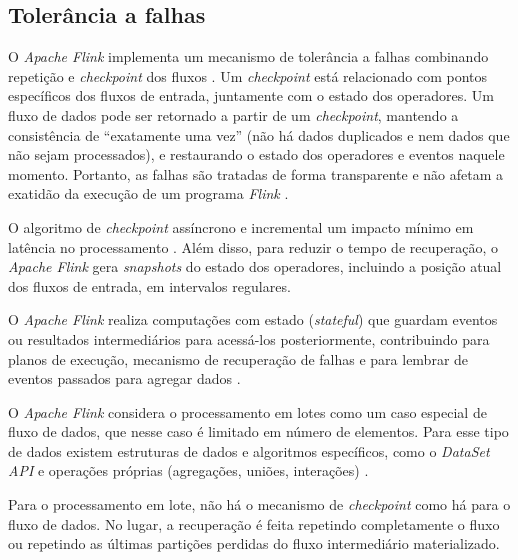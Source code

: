
\subsection{Tolerância a falhas}

O \emph{Apache Flink} implementa um mecanismo de tolerância a falhas combinando repetição e
\emph{checkpoint} dos fluxos \cite{Carbone2015,ApacheFlink2020}.
Um \emph{checkpoint} está relacionado com pontos específicos dos fluxos de
entrada, juntamente com o estado dos operadores.
Um fluxo de dados pode ser retornado a partir de um \emph{checkpoint}, mantendo
a consistência de ``exatamente uma vez'' (não há dados duplicados e nem dados que
não sejam processados), e restaurando o estado dos operadores e eventos naquele
momento.
Portanto, as falhas são tratadas de forma transparente e não afetam a exatidão
da execução de um programa \emph{Flink} \cite{ApacheFlink2020}.

O algoritmo de \emph{checkpoint} assíncrono e incremental  um impacto
mínimo em latência no processamento \cite{Carbone2015}.
Além disso, para reduzir o tempo de recuperação, o \emph{Apache Flink} gera
\emph{snapshots} do estado dos operadores, incluindo a posição atual dos fluxos
de entrada, em intervalos regulares.


O \emph{Apache Flink} realiza computações com estado (\emph{stateful}) que guardam
eventos ou resultados intermediários para acessá-los posteriormente,
contribuindo para planos de execução, mecanismo de recuperação de falhas e para
lembrar de eventos passados para agregar dados \cite{ApacheFlink2020, Carbone2015}.


O \emph{Apache Flink} considera o processamento em lotes como um caso especial
de fluxo de dados, que nesse caso é limitado em número de elementos.
Para esse tipo de dados existem estruturas de dados e algoritmos específicos, como o
\emph{DataSet API} e operações próprias (agregações, uniões, interações)
\cite{Carbone2015}.

Para o processamento em lote, não há o mecanismo de \emph{checkpoint} como há
para o fluxo de dados.
No lugar, a recuperação é feita repetindo completamente o fluxo ou repetindo as
últimas partições perdidas do fluxo intermediário materializado.


